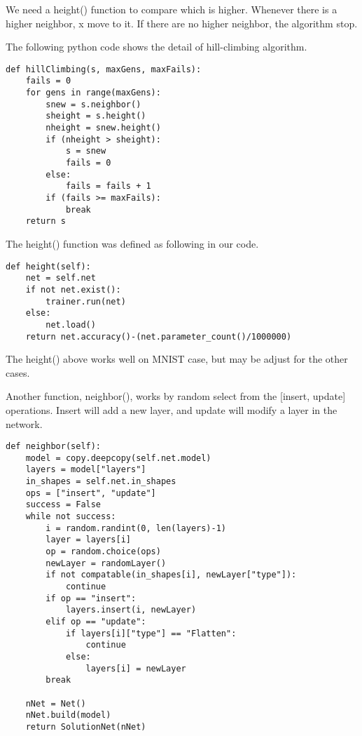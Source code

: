 \documentclass{article}
\begin{document}
We need a height() function to compare which is higher. Whenever there is a higher neighbor, x move to it. If there are no higher neighbor, the algorithm stop.

The following python code shows the detail of hill-climbing algorithm. 

\begin{minipage}{\linewidth}
\begin{lstlisting}
def hillClimbing(s, maxGens, maxFails):
    fails = 0
    for gens in range(maxGens):
        snew = s.neighbor()
        sheight = s.height()
        nheight = snew.height()
        if (nheight > sheight):
            s = snew
            fails = 0
        else:
            fails = fails + 1
        if (fails >= maxFails):
            break
    return s
\end{lstlisting}
\end{minipage}

The height() function was defined as following in our code.

\begin{minipage}{\linewidth}
\begin{lstlisting}
def height(self):
    net = self.net
    if not net.exist():
        trainer.run(net)
    else:
        net.load()
    return net.accuracy()-(net.parameter_count()/1000000)
\end{lstlisting}
\end{minipage}

The height() above works well on MNIST case, but may be adjust for the other cases. 

Another function, neighbor(), works by random select from the [insert, update] operations. Insert will add a new layer, and update will modify a layer in the network.

\begin{minipage}{\linewidth}
\begin{lstlisting}
def neighbor(self):
    model = copy.deepcopy(self.net.model)
    layers = model["layers"]
    in_shapes = self.net.in_shapes
    ops = ["insert", "update"]
    success = False
    while not success:
        i = random.randint(0, len(layers)-1)
        layer = layers[i]
        op = random.choice(ops)
        newLayer = randomLayer()
        if not compatable(in_shapes[i], newLayer["type"]):
            continue
        if op == "insert":
            layers.insert(i, newLayer)
        elif op == "update":
            if layers[i]["type"] == "Flatten":
                continue
            else:
                layers[i] = newLayer
        break

    nNet = Net()
    nNet.build(model)
    return SolutionNet(nNet)
\end{lstlisting}
\end{minipage}
\end{document}
